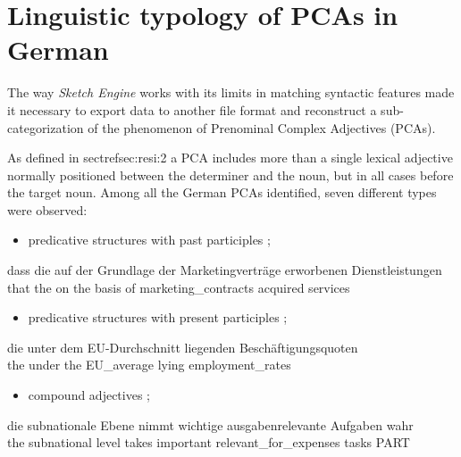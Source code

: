 \documentclass[output=paper,colorlinks,citecolor=brown]{langscibook}
\begin{document}
\section{Linguistic typology of PCAs in German}\label{sec:resi:4}

The way \textit{Sketch Engine} works with its limits in matching syntactic features made it necessary to export data to another file format and reconstruct a sub-categorization of the phenomenon of Prenominal Complex Adjectives (PCAs).

As defined in sectref{sec:resi:2} a PCA includes more than a single lexical adjective normally positioned between the determiner and the noun, but in all cases before the target noun. Among all the German PCAs identified, seven different types were observed:

\begin{itemize}
\item predicative structures with past participles ;
\end{itemize}

\ea%
    \label{ex:resi:4}
\gll dass  die  auf  der  Grundlage  der  Marketingverträge  erworbenen  Dienstleistungen \\
     that  the  on  the  basis       of  marketing\_contracts  acquired  services  \\
\z

\begin{itemize}
\item predicative structures with present participles ;
\end{itemize}

\ea%
    \label{ex:resi:5}
\gll die  unter  dem  EU-Durchschnitt  liegenden  Beschäftigungsquoten \\
      the  under  the  EU\_average  lying  employment\_rates \\
\z



\begin{itemize}
\item compound adjectives ;
\end{itemize}

\ea%
    \label{ex:resi:6}
\gll die  subnationale  Ebene  nimmt  wichtige  ausgabenrelevante  Aufgaben  wahr \\
   the  subnational  level  takes  important  relevant\_for\_expenses  tasks PART    \\
\z
\end{document}
